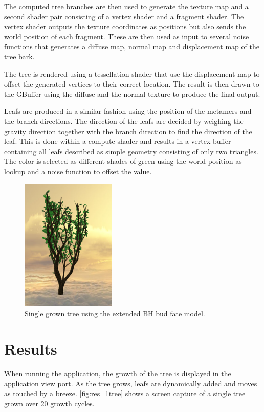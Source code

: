 \documentclass[11pt]{article} %
\begin{document}
The computed tree branches are then used to generate the texture map and a second shader pair consisting of a vertex shader and a fragment shader.
The vertex shader outputs the texture coordinates as positions but also sends the world position of each fragment.
These are then used as input to several noise functions that generates a diffuse map, normal map and displacement map of the tree bark.

The tree is rendered using a tessellation shader that use the displacement map to offset the generated vertices to their correct location.
The result is then drawn to the GBuffer using the diffuse and the normal texture to produce the final output.

Leafs are produced in a similar fashion using the position of the metamers and the branch directions.
The direction of the leafs are decided by weighing the gravity direction together with the branch direction to find the direction of the leaf.
This is done within a compute shader and results in a vertex buffer containing all leafs described as simple geometry consisting of only two triangles.
The color is selected as different shades of green using the world position as lookup and a noise function to offset the value.

\begin{figure}[htp]
	\centering
	\includegraphics[width=0.4\textwidth]{1tree.png}
	\caption{Single grown tree using the extended BH bud fate model.}
	\label{fig:res_1tree}
\end{figure}

\section{Results}
When running the application, the growth of the tree is displayed in the application view port.
As the tree grows, leafs are dynamically added and moves as touched by a breeze.
\autoref{fig:res_1tree} shows a screen capture of a single tree grown over 20 growth cycles.
\end{document}
